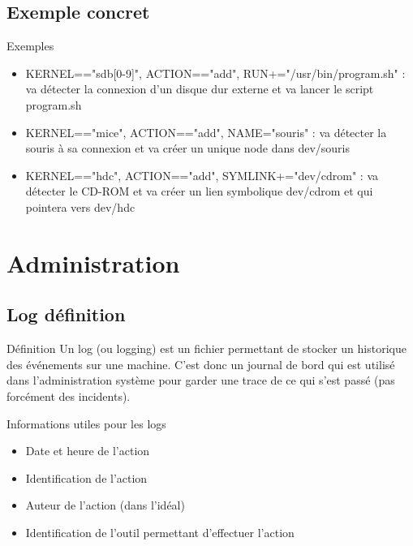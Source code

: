 \documentclass{beamer}
\begin{document}
\subsection{Exemple concret}
\begin{frame}
\begin{exampleblock}{Exemples} 
	
	\begin{itemize}
		
		[circle]
		\item KERNEL=="sdb[0-9]", ACTION=="add", RUN+="/usr/bin/program.sh" : va détecter la connexion d'un disque dur externe et va lancer le script program.sh
		\item KERNEL=="mice", ACTION=="add", NAME="souris" : va détecter la souris à sa connexion et va créer un unique node dans dev/souris
		\item KERNEL=="hdc", ACTION=="add", SYMLINK+="dev/cdrom" : va détecter le CD-ROM et va créer un lien symbolique dev/cdrom et qui pointera vers dev/hdc
			
	\end{itemize}
\end{exampleblock}
\end{frame}

\section{Administration}

\subsection{Log définition}

\begin{frame}
\begin{block}{Définition} 
	Un log (ou logging) est un fichier permettant de stocker un historique des événements sur une machine. C'est donc un journal de bord qui est utilisé dans l'administration système pour garder une trace de ce qui s'est passé (pas forcément des incidents).
\end{block}


\begin{alertblock}{Informations utiles pour les logs}
	\begin{itemize}
		[circle]
		\item Date et heure de l'action
		\item Identification de l'action 
		\item Auteur de l'action (dans l'idéal)
		\item Identification de l'outil permettant d'effectuer l'action
	\end{itemize}
\end{alertblock}
\end{frame}
\end{document}
